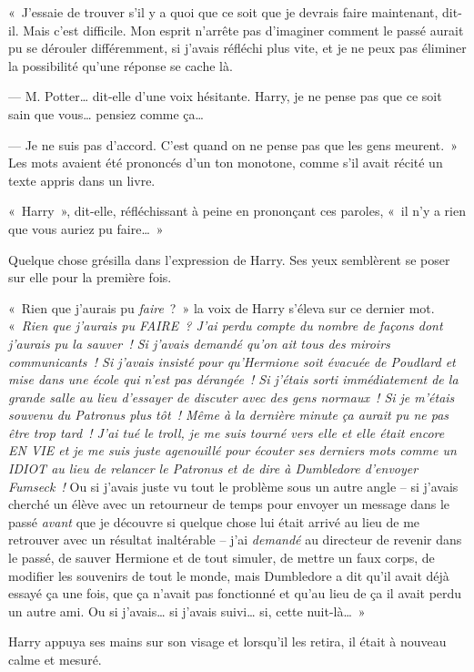 «~J'essaie de trouver s'il y a quoi que ce soit que je devrais faire maintenant, dit-il. Mais c'est difficile. Mon esprit n'arrête pas d'imaginer comment le passé aurait pu se dérouler différemment, si j'avais réfléchi plus vite, et je ne peux pas éliminer la possibilité qu'une réponse se cache là.

--- M. Potter… dit-elle d'une voix hésitante. Harry, je ne pense pas que ce soit sain que vous… pensiez comme ça…

--- Je ne suis pas d'accord. C'est quand on ne pense pas que les gens meurent.~» Les mots avaient été prononcés d'un ton monotone, comme s'il avait récité un texte appris dans un livre.

«~Harry~», dit-elle, réfléchissant à peine en prononçant ces paroles, «~il n'y a rien que vous auriez pu faire…~»

Quelque chose grésilla dans l'expression de Harry. Ses yeux semblèrent se poser sur elle pour la première fois.

«~Rien que j'aurais pu \emph{faire}~?~» la voix de Harry s'éleva sur ce dernier mot. «~\emph{Rien que j'aurais pu FAIRE~? J'ai perdu compte du nombre de façons dont j'aurais pu la sauver~! Si j'avais demandé qu'on ait tous des miroirs communicants~! Si j'avais insisté pour qu'Hermione soit évacuée de Poudlard et mise dans une école qui n'est pas dérangée~! Si j'étais sorti immédiatement de la grande salle au lieu d'essayer de discuter avec des gens normaux~! Si je m'étais souvenu du Patronus plus tôt~! Même à la dernière minute ça aurait pu ne pas être trop tard~! J'ai tué le troll, je me suis tourné vers elle et elle était encore EN VIE et je me suis juste agenouillé pour écouter ses derniers mots comme un IDIOT au lieu de relancer le Patronus et de dire à Dumbledore d'envoyer Fumseck~!} Ou si j'avais juste vu tout le problème sous un autre angle -- si j'avais cherché un élève avec un retourneur de temps pour envoyer un message dans le passé \emph{avant} que je découvre si quelque chose lui était arrivé au lieu de me retrouver avec un résultat inaltérable -- j'ai \emph{demandé} au directeur de revenir dans le passé, de sauver Hermione et de tout simuler, de mettre un faux corps, de modifier les souvenirs de tout le monde, mais Dumbledore a dit qu'il avait déjà essayé ça une fois, que ça n'avait pas fonctionné et qu'au lieu de ça il avait perdu un autre ami. Ou si j'avais… si j'avais suivi… si, cette nuit-là…~»

Harry appuya ses mains sur son visage et lorsqu'il les retira, il était à nouveau calme et mesuré.


